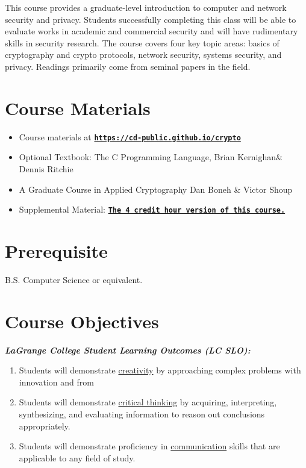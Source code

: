 \documentclass[11pt]{article}
\begin{document}
This course provides a graduate-level introduction to computer and network security and privacy. Students successfully completing this class will be able to evaluate works in academic and commercial security and will have rudimentary skills in security research. The course covers four key topic areas: basics of cryptography and crypto protocols, network security, systems security, and privacy. Readings primarily come from seminal papers in the field. 


\section*{Course Materials}

\begin{itemize}
\item Course materials at \href{https://cd-public.github.io/crypto/}{\tt\bf https://cd-public.github.io/crypto}
\item Optional Textbook: The C Programming Language, Brian Kernighan\& Dennis Ritchie
\item A Graduate Course in Applied Cryptography Dan Boneh \& Victor Shoup
\item Supplemental Material: \href{https://cd-public.github.io/courses/old/c89s25/index.html/}{\tt\bf The 4 credit hour version of this course.}
\end{itemize}


\section*{Prerequisite}
B.S. Computer Science or equivalent.


\section*{Course Objectives}
\textbf{\textit{LaGrange College Student Learning Outcomes (LC SLO):}}

\begin{enumerate}
\item Students will demonstrate \underline{creativity} by approaching complex problems with innovation and from
\item Students will demonstrate \underline{critical thinking} by acquiring, interpreting, synthesizing, and evaluating
information to reason out conclusions appropriately.
\item Students will demonstrate proficiency in \underline{communication} skills that are applicable to any field of
study.
\end{enumerate}
\end{document}
